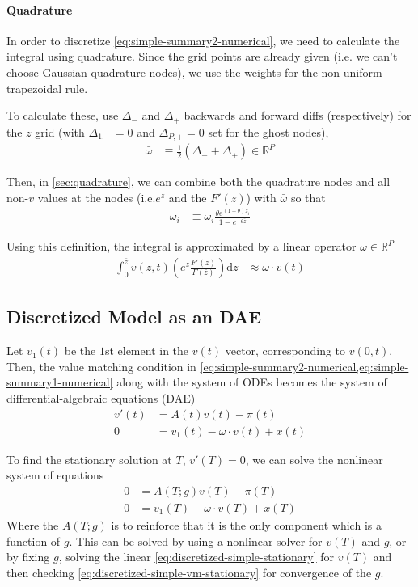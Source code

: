 \documentclass[11pt]{article}
\newcommand{\R}{\ensuremath{\mathbb{R}}}
\newcommand{\diff}{\ensuremath{\mathrm{d}}}
\begin{document}
\paragraph{Quadrature}
In order to discretize \cref{eq:simple-summary2-numerical}, we need to calculate the integral using quadrature.  Since the grid points are already given (i.e. we can't choose Gaussian quadrature nodes), we use the weights for the non-uniform trapezoidal rule.

To calculate these, use $\Delta_{-}$ and $\Delta_{+}$ backwards and forward diffs (respectively) for the $z$ grid (with $\Delta_{1,-} = 0$ and $\Delta_{P,+} = 0$ set for the ghost nodes),
\begin{align}
\bar{\omega}&\equiv \frac1{2}(\Delta_{-} + \Delta_{+})\in \R^P
\end{align}

Then, in \cref{sec:quadrature}, we can combine both the quadrature nodes and all non-$v$ values at the nodes (i.e.$e^z$ and the $F'(z)$) with $\bar{\omega}$ so that
\begin{align}
\omega_i &\equiv \bar{\omega}_i \frac{\theta e^{(1 - \theta)z_i}}{1 - e^{-\theta \bar{z}}}
\end{align}

\noindent Using this definition, the integral is approximated by a linear operator $\omega\in\R^P$
\begin{align}
 \int_{0}^{\bar{z}}  v(z,t) \left(e^z \frac{F'(z)}{F(\bar{z})}\right) \diff z &\approx \omega \cdot v(t)
\end{align}

\subsection{Discretized Model as an DAE}
Let $v_1(t)$ be the $1$st element in the $v(t)$ vector, corresponding to $v(0,t)$.  Then, the value matching condition in \cref{eq:simple-summary2-numerical,eq:simple-summary1-numerical} along with the system of ODEs becomes the system of differential-algebraic equations (DAE)
\begin{align}
	v'(t) &= A(t) v(t) - \pi(t)\label{eq:discretized-simple}\\
	0 &= v_1(t) - \omega \cdot v(t) + x(t)\label{eq:discretized-simple-vm}
\end{align}


\noindent To find the stationary solution at $T$,  $v'(T) = 0$, we can solve the nonlinear system of equations
\begin{align}
	0 &= A(T; g) v(T) - \pi(T)\label{eq:discretized-simple-stationary}\\
	0 &= v_1(T) - \omega \cdot v(T) + x(T)\label{eq:discretized-simple-vm-stationary}
\end{align}
Where the $ A(T; g)$ is to reinforce that it is the only component which is a function of $g$.  This can be solved by using a nonlinear solver for $v(T)$ and $g$, or by fixing $g$, solving the linear \cref{eq:discretized-simple-stationary} for $v(T)$ and then checking \cref{eq:discretized-simple-vm-stationary} for convergence of the $g$.
\end{document}
